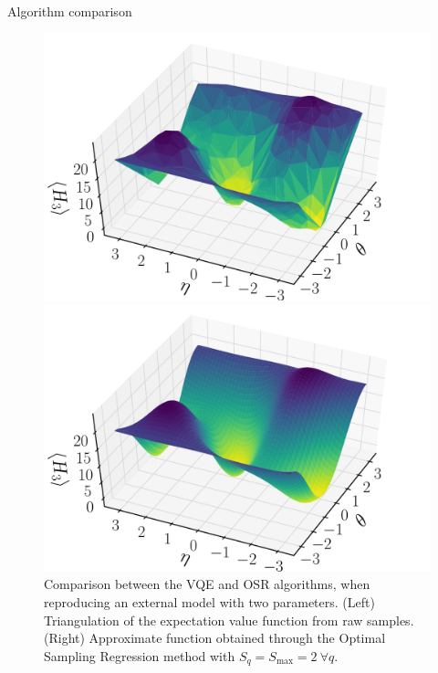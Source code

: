 \documentclass[9pt, handout, aspectratio=169]{beamer}	%
\begin{document}

\begin{frame}{Algorithm comparison}

\begin{figure}[!tbp]
	\centering
	\begin{minipage}[c]{.40\linewidth}
		\centering
		\includegraphics[width=\linewidth]{Figures/NJL1-model-solving/deuteron-VQE}
	\end{minipage}
	\hspace{.025\linewidth}
	\begin{minipage}[c]{.40\linewidth}
		\centering
		\includegraphics[width=\linewidth]{Figures/NJL1-model-solving/deuteron-OSR}
	\end{minipage}
	\caption{Comparison between the VQE and OSR algorithms, when reproducing an external model with two parameters. (Left) Triangulation of the expectation value function from raw samples. (Right) Approximate function obtained through the Optimal Sampling Regression method with $S_q=S_{\text{max}}=2 ~\forall q$.}
\end{figure}


\end{frame}
\end{document}
